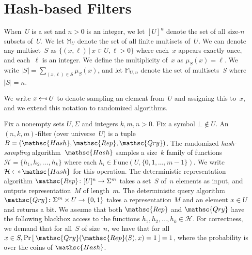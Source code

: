 \newcommand{\Rep}{\mathsc{Rep}}
\newcommand{\Hash}{\mathsc{Hash}}
\newcommand{\Qry}{\mathsc{Qry}}
\newcommand{\Update}{\mathsc{Up}}
\newcommand{\Init}{\mathsc{Init}}
\newcommand{\Test}{\mathsc{Test}}
\newcommand{\multiset}[1]{\mathbb{M}_{#1}}
\newcommand{\ExpCorrectSecHash}[2]{\mathrm{Exp}^{\mathrm{cor\mbox{-}prv}}_{#1}(#2)}
\newcommand{\ExpCorrectPubHash}[2]{\mathrm{Exp}^{\mathrm{cor\mbox{-}pub}}_{#1}(#2)}
\newcommand{\ExpCorrect}[2]{\mathrm{Exp}^{\mathrm{cor}}_{#1}(#2)}

\newcommand{\QryOracle}{\mathsf{Query}}
\newcommand{\UpdateOracle}{\mathsf{Update}}
\newcommand{\HashOracle}{\mathsf{Hash}}

\section{Hash-based Filters}
When~$U$ is a set and $n>0$ is an integer, we let $[U]^n$ denote the set of all size-$n$ subsets of~$U$.  We let $\multiset{U}$ denote the set of all finite multisets of~$U$.  We can denote any multiset~$S$ as $\{(x,\ell) \,|\, x \in U, \ell > 0\}$ where each~$x$ appears exactly once, and each~$\ell$ is an integer.  We define the multiplicity of~$x$ as $\mu_S(x) = \ell$.  We write $|S|= \sum_{(x,\ell)\in S}\mu_S(x)$, and let $\multiset{U,n}$ denote the set of multisets~$S$ where $|S|=n$. 

We write $x \getsr U$ to denote sampling an element from~$U$ and assigning this to~$x$, and we extend this notation to randomized algorithms.

Fix a nonempty sets $U,\Sigma$ and integers $k,m,n>0$.  Fix a symbol $\bot \not\in U$.  An $(n,k,m)$-filter (over universe~$U$) is a tuple  $B=(\Hash,\Rep,\Qry)$.   
%
The randomized \emph{hash-sampling} algorithm~$\Hash$ samples a size~$k$ family of functions~$\mathcal{H}=\{h_1,h_2,\ldots,h_k\}$ where each $h_i \in  \mathrm{Func}(U,\{0,1,\ldots,m-1\})$.  We write $\mathcal{H} \getsr \Hash$ for this operation.
%
The deterministic representation algorithm $\Rep\colon [U]^n \rightarrow \Sigma^m$ takes a set~$S$ of~$n$ elements as input, and outputs representation~$M$ of length~$m$.
%
The determinisitc query algorithm $\Qry\colon \Sigma^m \times U \rightarrow \bits$ takes a representation $M$ and an element $x \in U$ and returns a bit.  
%
We assume that both $\Rep$ and $\Qry$ have the following blackbox access to the functions $h_1,h_2,\ldots,h_k \in \mathcal{H}$.
%
For correctness, we demand that for all~$S$ of size~$n$, we have that for all $x \in S, \Prob{\Qry(\Rep(S),x)=1}=1$, where the probability is over the coins of $\Hash$.  


